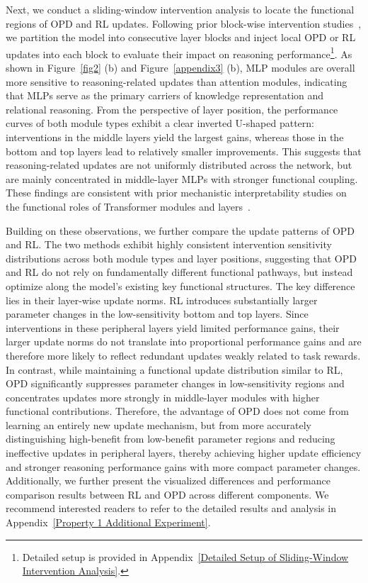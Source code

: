 \documentclass{llmxive}
\begin{document}
Next, we conduct a sliding-window intervention analysis to locate the functional regions of OPD and RL updates. Following prior block-wise intervention studies~\citep{cai2024locatingmitigatinggenderbias, meng2023locatingeditingfactualassociations}, we partition the model into consecutive layer blocks and inject local OPD or RL updates into each block to evaluate their impact on reasoning performance\footnote{Detailed setup is provided in Appendix~\ref{Detailed Setup of Sliding-Window Intervention Analysis}.}. As shown in Figure~\ref{fig2} (b) and Figure~\ref{appendix3} (b), MLP modules are overall more sensitive to reasoning-related updates than attention modules, indicating that MLPs serve as the primary carriers of knowledge representation and relational reasoning. From the perspective of layer position, the performance curves of both module types exhibit a clear inverted U-shaped pattern: interventions in the middle layers yield the largest gains, whereas those in the bottom and top layers lead to relatively smaller improvements. This suggests that reasoning-related updates are not uniformly distributed across the network, but are mainly concentrated in middle-layer MLPs with stronger functional coupling. These findings are consistent with prior mechanistic interpretability studies on the functional roles of Transformer modules and layers~\citep{skean2025layer, geva2021transformerfeedforwardlayerskeyvalue, geva2022transformerfeedforwardlayersbuild}.

Building on these observations, we further compare the update patterns of OPD and RL. The two methods exhibit highly consistent intervention sensitivity distributions across both module types and layer positions, suggesting that OPD and RL do not rely on fundamentally different functional pathways, but instead optimize along the model's existing key functional structures. The key difference lies in their layer-wise update norms. RL introduces substantially larger parameter changes in the low-sensitivity bottom and top layers. Since interventions in these peripheral layers yield limited performance gains, their larger update norms do not translate into proportional performance gains and are therefore more likely to reflect redundant updates weakly related to task rewards. In contrast, while maintaining a functional update distribution similar to RL, OPD significantly suppresses parameter changes in low-sensitivity regions and concentrates updates more strongly in middle-layer modules with higher functional contributions. Therefore, the advantage of OPD does not come from learning an entirely new update mechanism, but from more accurately distinguishing high-benefit from low-benefit parameter regions and reducing ineffective updates in peripheral layers, thereby achieving higher update efficiency and stronger reasoning performance gains with more compact parameter changes. Additionally, we further present the visualized differences and performance comparison results between RL and OPD across different components. We recommend interested readers to refer to the detailed results and analysis in Appendix~\ref{Property 1 Additional Experiment}.
\end{document}
